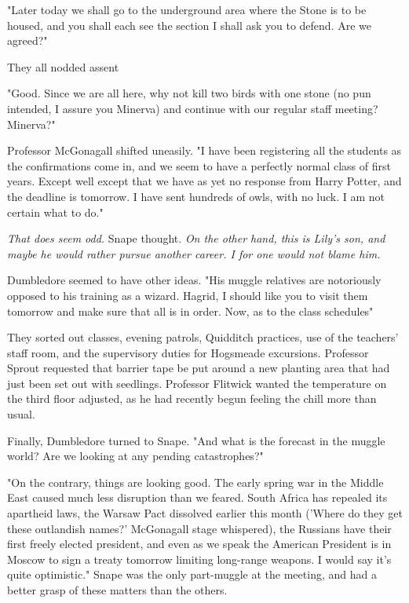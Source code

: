 "Later today we shall go to the underground area where the Stone is to be housed, and you shall each see the section I shall ask you to defend. Are we agreed?"

They all nodded assent

"Good. Since we are all here, why not kill two birds with one stone (no pun intended, I assure you Minerva) and continue with our regular staff meeting? Minerva?"

Professor McGonagall shifted uneasily. "I have been registering all the students as the confirmations come in, and we seem to have a perfectly normal class of first years. Except{\el} well except that we have as yet no response from Harry Potter, and the deadline is tomorrow. I have sent hundreds of owls, with no luck. I am not certain what to do."

\emph{That does seem odd.} Snape thought. \emph{On the other hand, this is Lily's son, and maybe he would rather pursue another career. I for one would not blame him.}

Dumbledore seemed to have other ideas. "His muggle relatives are notoriously opposed to his training as a wizard. Hagrid, I should like you to visit them tomorrow and make sure that all is in order. Now, as to the class schedules{\el}"

They sorted out classes, evening patrols, Quidditch practices, use of the teachers' staff room, and the supervisory duties for Hogsmeade excursions. Professor Sprout requested that barrier tape be put around a new planting area that had just been set out with seedlings. Professor Flitwick wanted the temperature on the third floor adjusted, as he had recently begun feeling the chill more than usual.

Finally, Dumbledore turned to Snape. "And what is the forecast in the muggle world? Are we looking at any pending catastrophes?"

"On the contrary, things are looking good. The early spring war in the Middle East caused much less disruption than we feared. South Africa has repealed its apartheid laws, the Warsaw Pact dissolved earlier this month ('Where do they get these outlandish names?' McGonagall stage whispered), the Russians have their first freely elected president, and even as we speak the American President is in Moscow to sign a treaty tomorrow limiting long-range weapons. I would say it's quite optimistic." Snape was the only part-muggle at the meeting, and had a better grasp of these matters than the others.

